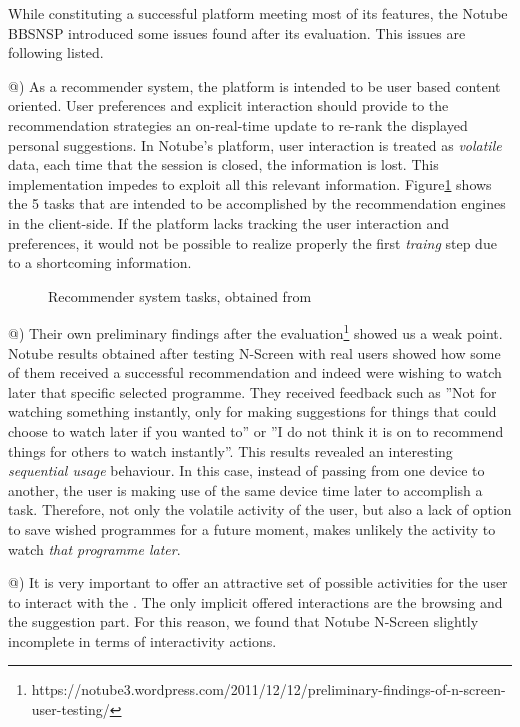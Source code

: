 \documentclass{acm_proc_article-sp}
\makeatletter
\newcommand*{\rom}[1]{\expandafter\@slowromancap\romannumeral #1@}
\makeatother
\begin{document}
While constituting a successful platform meeting most of its features, the Notube BBSNSP introduced some issues found after its evaluation. This issues are following listed. 

\rom{1}) As a recommender system, the platform is intended to be user based content oriented. User preferences and explicit interaction should provide to the recommendation strategies an on-real-time update to re-rank the displayed personal suggestions\cite{libbyrecommender}. In Notube's platform, user interaction is treated as \textit{volatile} data, each time that the session is closed, the information is lost. This implementation impedes to exploit all this relevant information. Figure\ref{fig:recomm} shows the 5 tasks that are intended to be accomplished by the recommendation engines in the client-side. If the platform lacks tracking the user interaction and preferences, it would not be possible to realize properly the first \textit{traing} step due to a shortcoming information.

\begin{figure}[!htb]
\centering
{}
\caption{Recommender system tasks, obtained from \cite{libbyrecommender}}
\label{fig:recomm}
\end{figure}

\rom{2}) Their own preliminary findings after the evaluation\footnote{https://notube3.wordpress.com/2011/12/12/preliminary-findings-of-n-screen-user-testing/} showed us a weak point. Notube results obtained after testing N-Screen with real users showed how some of them received a successful recommendation and indeed were wishing to watch later that specific selected programme. They received feedback such as ''Not for watching something instantly, only for making suggestions for things that could choose to watch later if you wanted to'' or ''I do not think it is on to recommend things for others to watch instantly''. This results revealed an interesting \textit{sequential usage} behaviour. In this case, instead of passing from one device to another, the user is making use of the same device time later to accomplish a task. Therefore, not only the volatile activity of the user, but also a lack of option to save wished programmes for a future moment, makes unlikely the activity to watch \textit{that programme later}. 

\rom{3}) It is very important to offer an attractive set of possible activities for the user to interact with the \cite{skadberg2004visitors}. The only implicit offered interactions are the browsing and the suggestion part. For this reason, we found that Notube N-Screen slightly incomplete in terms of interactivity actions. 
\end{document}
